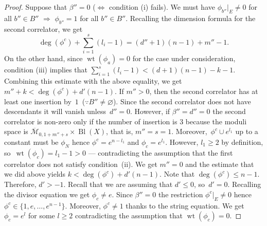 \documentclass[pdftex]{sigma}
\numberwithin{equation}{section}
\begin{document}
\begin{proof}
Suppose that $\beta''=0$ ($\Leftrightarrow$ condition (i) fails). We must have $\phi_{b''}|_E\neq 0$ for all $b''\in B''$ $\Rightarrow$ $\phi_{b''}=1$ for all $b''\in B''$. Recalling the dimension formula for the second correlator, we get
\[
\operatorname{deg}(\phi^c)+\sum_{i=1}^{s} (l_i-1) = (d''+1)(n-1) + m''-1.
\]
On the other hand, since $\operatorname{wt}(\phi_a)=0$ for the case under consideration, condition (iii) implies that $\sum_{i=1}^s (l_i-1) < (d+1)(n-1) -k-1$. Combining this estimate with the above equality, we get~$m''+k < \operatorname{deg}(\phi^c) + d'(n-1).$ If $m''>0$, then the second correlator has at least one insertion by~$1$~($\because B''\neq \varnothing$). Since the second correlator does not have descendants it will vanish unless~$d''=0$. However, if $\beta''=d''=0$ the second correlator is non-zero only if the number of insertion is $3$ because the moduli space is $\overline{\mathcal{M}}_{0,1+m''+s}\times \operatorname{Bl}(X)$, that is, $m''=s=1$. Moreover,~$\phi^c \cup e^{l_1}$ up to a constant must be $\phi_N$ hence $\phi^c = e^{n-l_1}$ and $\phi_c= e^{l_1}$. However, $l_1\geq 2$ by definition, so~$\operatorname{wt}(\phi_c)=l_1-1>0$ --- contradicting the assumption that the first correlator does not satisfy condition~(ii). We get $m''=0$ and the estimate that we did above yields $k<\operatorname{deg}(\phi^c) + d'(n-1).$ Note that $\operatorname{deg}(\phi^c)\leq n-1$. Therefore, $d'>-1$. Recall that we are assuming that $d'\leq 0$, so~$d'=0$. Recalling the divisor equation we get $\phi_c\neq e$. Since $\beta''=0$ the restriction $\phi^c|_E\neq 0$ hence $\phi^c\in \big\{1,e,\dots,e^{n-1}\big\}$. Moreover, $\phi^c\neq 1$ thanks to the string equation. We get $\phi_c=e^l$ for some $l\geq 2$ contradicting the assumption that $\operatorname{wt}(\phi_c)=0$.


\end{proof}
\end{document}
